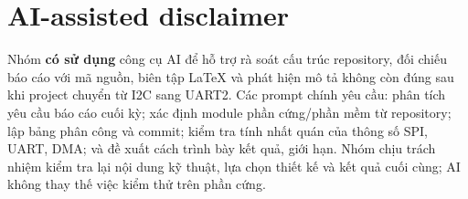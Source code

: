 \section{AI-assisted disclaimer}

Nhóm \textbf{có sử dụng} công cụ AI để hỗ trợ rà soát cấu trúc repository, đối chiếu báo cáo với mã nguồn, biên tập LaTeX và phát hiện mô tả không còn đúng sau khi project chuyển từ I2C sang UART2. Các prompt chính yêu cầu: phân tích yêu cầu báo cáo cuối kỳ; xác định module phần cứng/phần mềm từ repository; lập bảng phân công và commit; kiểm tra tính nhất quán của thông số SPI, UART, DMA; và đề xuất cách trình bày kết quả, giới hạn. Nhóm chịu trách nhiệm kiểm tra lại nội dung kỹ thuật, lựa chọn thiết kế và kết quả cuối cùng; AI không thay thế việc kiểm thử trên phần cứng.
